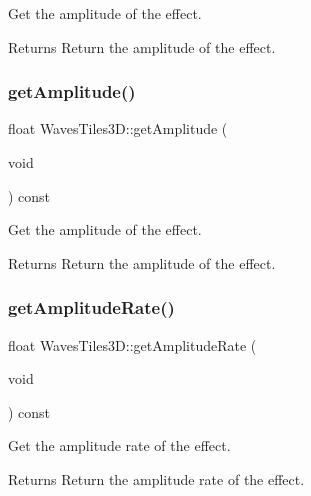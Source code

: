Get the amplitude of the effect. 

\begin{DoxyReturn}{Returns}
Return the amplitude of the effect. 
\end{DoxyReturn}
\mbox{\label{classWavesTiles3D_ad7036611a1e679ca1d7df8d6979b03de}} 
\subsubsection{\texorpdfstring{get\+Amplitude()}{getAmplitude()}\hspace{0.1cm}{\footnotesize\ttfamily [2/2]}}
{\footnotesize\ttfamily float Waves\+Tiles3\+D\+::get\+Amplitude (\begin{DoxyParamCaption}\item[{void}]{ }\end{DoxyParamCaption}) const\hspace{0.3cm}{\ttfamily [inline]}}



Get the amplitude of the effect. 

\begin{DoxyReturn}{Returns}
Return the amplitude of the effect. 
\end{DoxyReturn}
\mbox{\label{classWavesTiles3D_aac8edc171d3943248464c3fae596db1c}} 
\subsubsection{\texorpdfstring{get\+Amplitude\+Rate()}{getAmplitudeRate()}\hspace{0.1cm}{\footnotesize\ttfamily [1/2]}}
{\footnotesize\ttfamily float Waves\+Tiles3\+D\+::get\+Amplitude\+Rate (\begin{DoxyParamCaption}\item[{void}]{ }\end{DoxyParamCaption}) const\hspace{0.3cm}{\ttfamily [inline]}}



Get the amplitude rate of the effect. 

\begin{DoxyReturn}{Returns}
Return the amplitude rate of the effect. 
\end{DoxyReturn}
\mbox{\label{classWavesTiles3D_aac8edc171d3943248464c3fae596db1c}} 
